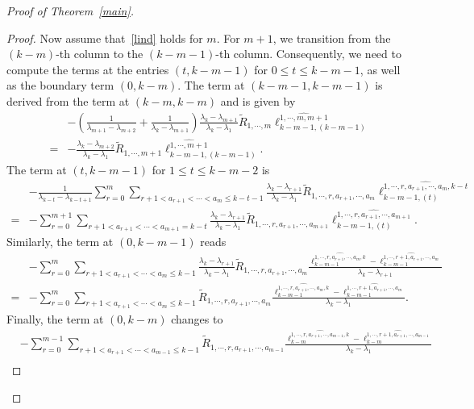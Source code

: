 \documentclass[a4paper]{article}
\theoremstyle{plain}
\theoremstyle{definition}
\newcommand{\nn}{\nonumber}
\begin{document}
\begin{proof}[Proof of Theorem~\ref{main}]
\begin{proof}
	Now assume that~\eqref{lind} holds for $m$. For $m+1$, we transition from the $(k-m)$-th column to the $(k-m-1)$-th column. Consequently, we need to compute the terms at the entries $(t,k-m-1)$ for $0\le t\le k-m-1$, as well as the boundary term $(0,k-m)$. The term at $(k-m-1,k-m-1)$ is derived from the term at $(k-m,k-m)$ and is given by
	\begin{align}
		&-\left(\frac{1}{\lambda_{m+1}-\lambda_{m+2}}+\frac{1}{\lambda_k-\lambda_{m+1}}\right)\frac{\lambda_k-\lambda_{m+1}}{\lambda_k-\lambda_1}\widetilde R_{1,\cdots,m}\ell_{k-m-1,(k-m-1)}^{\widehat{1,\cdots,m,m+1}}\nn\\
		=&-\frac{\lambda_k-\lambda_{m+2}}{\lambda_k-\lambda_1}\widetilde R_{1,\cdots,m+1}\ell_{k-m-1,(k-m-1)}^{\widehat{1,\cdots,m+1}}. \label{part1}
	\end{align}
	The term at $(t,k-m-1)$ for $1\le t\le k-m-2$ is
	\begin{align}
		&-\frac{1}{\lambda_{k-t}-\lambda_{k-t+1}}\sum_{r=0}^{m}\sum_{r+1<a_{r+1}<\cdots<a_m\le k-t-1}\frac{\lambda_k-\lambda_{r+1}}{\lambda_k-\lambda_1}\widetilde R_{1,\cdots,r,a_{r+1},\cdots,a_m}\ell_{k-m-1,(t)}^{\widehat{1,\cdots,r,a_{r+1},\cdots,a_m,k-t}}\nn\\
		=&-\sum_{r=0}^{m+1}\sum_{r+1<a_{r+1}<\cdots<a_{m+1}=k-t}\frac{\lambda_k-\lambda_{r+1}}{\lambda_k-\lambda_1}\widetilde R_{1,\cdots,r,a_{r+1},\cdots,a_{m+1}}\ell_{k-m-1,(t)}^{\widehat{1,\cdots,r,a_{r+1},\cdots,a_{m+1}}}. \label{part2}
	\end{align}
	Similarly, the term at $(0,k-m-1)$ reads
	\begin{align}
		&-\sum_{r=0}^{m}\sum_{r+1<a_{r+1}<\cdots<a_m\le k-1}\frac{\lambda_k-\lambda_{r+1}}{\lambda_k-\lambda_1}\widetilde R_{1,\cdots,r,a_{r+1},\cdots,a_m}\frac{\ell_{k-m-1}^{\widehat{1,\cdots,r,a_{r+1},\cdots,a_m,k}}-\ell_{k-m-1}^{\widehat{1,\cdots,r+1,a_{r+1},\cdots,a_m}}}{\lambda_k-\lambda_{r+1}}\nn\\
		=&-\sum_{r=0}^{m}\sum_{r+1<a_{r+1}<\cdots<a_m\le k-1}\widetilde R_{1,\cdots,r,a_{r+1},\cdots,a_m}\frac{\ell_{k-m-1}^{\widehat{1,\cdots,r,a_{r+1},\cdots,a_m,k}}-\ell_{k-m-1}^{\widehat{1,\cdots,r+1,a_{r+1},\cdots,a_m}}}{\lambda_k-\lambda_1}. \label{part3}
	\end{align}
	Finally, the term at $(0,k-m)$ changes to
	\begin{align}
		& -\sum_{r=0}^{m-1}\sum_{r+1<a_{r+1}<\cdots<a_{m-1}\le k-1}\widetilde R_{1,\cdots,r,a_{r+1},\cdots,a_{m-1}}\frac{\ell_{k-m}^{\widehat{1,\cdots,r,a_{r+1},\cdots,a_{m-1},k}}-\ell_{k-m}^{\widehat{1,\cdots,r+1,a_{r+1},\cdots,a_{m-1}}}}{\lambda_k-\lambda_1} \nn\\

\end{align}
\end{proof}
\end{proof}
\end{document}

